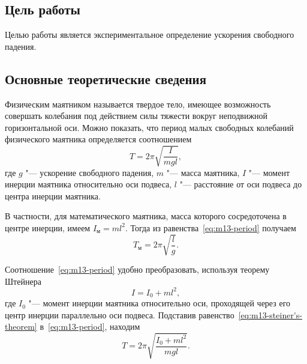 \documentclass[a4paper, 12pt]{extarticle}
\begin{document}
\MTDTitlePage
\MTDInfoPage

\setcounter{section}{13}

\subsection{Цель работы}
Целью работы является экспериментальное определение ускорения свободного падения.

\subsection{Основные теоретические сведения}
Физическим маятником называется твердое тело, имеющее возможность совершать колебания под действием силы тяжести вокруг неподвижной горизонтальной оси. Можно показать, что период малых свободных колебаний физического маятника определяется соотношением
\begin{equation}
\label{eq:m13-period}
T = 2 \pi \sqrt{\frac{I}{mgl}},
\end{equation}
где $g$ "--- ускорение свободного падения, $m$ "--- масса маятника, $I$ "--- момент инерции маятника относительно оси подвеса, $l$ "--- расстояние от оси подвеса до центра инерции маятника.

В частности, для математического маятника, масса которого сосредоточена в центре инерции, имеем $I_\text{м} = ml^2$. Тогда из равенства~\eqref{eq:m13-period} получаем
\begin{equation}
\label{eq:m13-math-pendulum-period}
T_\text{м} = 2 \pi \sqrt{\frac{l}{g}}.
\end{equation}

Соотношение~\eqref{eq:m13-period} удобно преобразовать, используя теорему
Штейнера
\begin{equation}
\label{eq:m13-steiner's-theorem}
I = I_0 + ml^2,
\end{equation}
где $I_0$ "--- момент инерции маятника относительно оси, проходящей через его центр инерции параллельно оси подвеса. Подставив равенство~\eqref{eq:m13-steiner's-theorem} в~\eqref{eq:m13-period}, находим
\begin{equation}
\label{eq:m13-period-2}
T = 2 \pi \sqrt{\frac{I_0 + ml^2}{mgl}}.
\end{equation}
\end{document}
